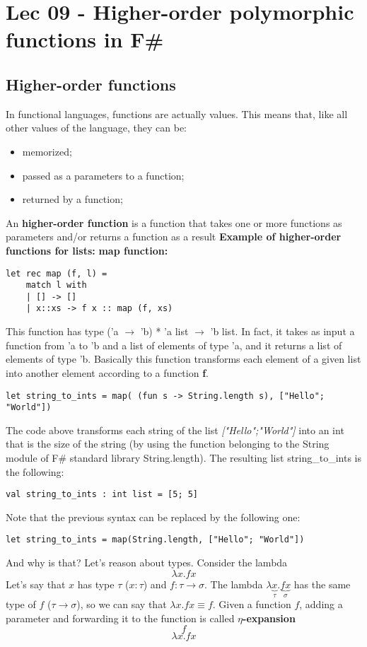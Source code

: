 \chapter{Lec 09 - Higher-order polymorphic functions in F\#}
\section{Higher-order functions}
In functional languages, functions are actually values. This means that, like all other values of the language, they can be:
\begin{itemize}
    \item memorized;
    \item passed as a parameters to a function;
    \item returned by a function;
\end{itemize}
An \textbf{higher-order function} is a function that takes one or more functions as parameters and/or returns a function as a result\newline
\textbf{Example of higher-order functions for lists:} \newline \newline
\textbf{map function:}
\begin{lstlisting}
let rec map (f, l) = 
    match l with
    | [] -> []
    | x::xs -> f x :: map (f, xs)
\end{lstlisting}
This function has type ('a $\rightarrow$ 'b) * 'a list $\rightarrow$ 'b list. In fact, it takes as input a function from 'a to 'b and a list of elements of type 'a, and it returns a list of elements of type 'b. Basically this function transforms each element of a given list into another element according to a function \textbf{f}.
\begin{lstlisting}
let string_to_ints = map( (fun s -> String.length s), ["Hello"; "World"])
\end{lstlisting}
The code above transforms each string of the list \textit{["Hello";"World"]} into an int that is the size of the string (by using the function belonging to the String module of F\# standard library String.length). The resulting list string\_to\_ints is the following:
\begin{lstlisting}
val string_to_ints : int list = [5; 5]
\end{lstlisting}
Note that the previous syntax can be replaced by the following one:
\begin{lstlisting}
let string_to_ints = map(String.length, ["Hello"; "World"])
\end{lstlisting}
And why is that? Let's reason about types. \newline
Consider the lambda 
\[\lambda x.fx\]
Let's say that $x$ has type $\tau$ ($x:\tau$) and $f:\tau \rightarrow \sigma$. The lambda $\lambda \underbrace{x}_\tau.\underbrace{fx}_\sigma$ has the same type of $f$ ($\tau \rightarrow \sigma$), so we can say that $\lambda x.fx \equiv f$. \newline
Given a function $f$, adding a parameter and forwarding it to the function is called \textbf{$\eta$-expansion}
\[f\]
\[\lambda x.fx\]
